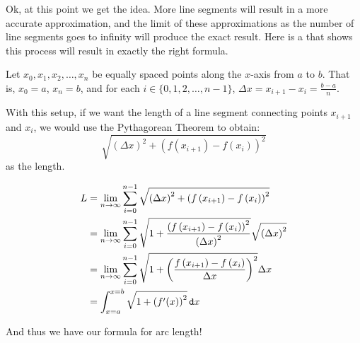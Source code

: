 Ok, at this point we get the idea.  More line segments will result in a more accurate approximation, and the limit of these approximations as the number of line segments goes to infinity will produce the exact result.  Here is a  that shows this process will result in exactly the right formula.

Let $x_0,x_1,x_2,\ldots,x_n$ be equally spaced points along the $x$-axis from $a$ to $b$.  That is, $x_0=a$, $x_n=b$, and for each $i\in\lbrace 0,1,2,\ldots , n-1 \rbrace$, $\Delta x = x_{i+1}-x_{i}=\frac{b-a}{n}$.

With this setup, if we want the length of a line segment connecting points $x_{i+1}$ and $x_{i}$, we would use the Pythagorean Theorem to obtain: 
$$\sqrt{\left(\Delta x\right)^2+\left(f\left(x_{i+1}\right)-f\left(x_i\right)\right)^2 } $$ as the length.


\begin{align*}
L&=\lim_{n\rightarrow \infty}\sum_{i=0}^{n-1} \sqrt{\left(\Delta x\right)^2+\left(f\left(x_{i+1}\right)-f\left(x_i\right)\right)^2 } \\
&=\lim_{n\rightarrow \infty}\sum_{i=0}^{n-1} \sqrt{1+\frac{\left(f\left(x_{i+1}\right)-f\left(x_i\right)\right)^2}{\left( \Delta x\right)^2} } \sqrt{\left(\Delta x\right)^2} \\
&=\lim_{n\rightarrow \infty}\sum_{i=0}^{n-1} \sqrt{1+\left( \frac{f\left(x_{i+1}\right)-f\left(x_i\right)}{\Delta x}\right)^2 } \Delta x \\
&=\int_{x=a}^{x=b} \sqrt{1+\left( f'(x)\right)^2 } \mathop{}\!\mathtt{d} x
\end{align*}

And thus we have our formula for arc length!


